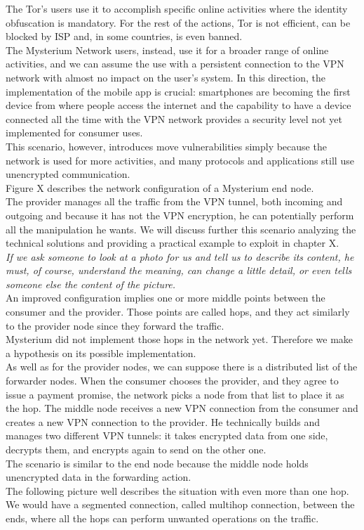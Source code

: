 \documentclass[12pt]{article}
\begin{document}
	The Tor's users use it to accomplish specific online activities where the identity obfuscation is mandatory. For the rest of the actions, Tor is not efficient, can be blocked by ISP and, in some countries, is even banned.\\
	The Mysterium Network users, instead, use it for a broader range of online activities, and we can assume the use with a persistent connection to the VPN network with almost no impact on the user's system. In this direction, the implementation of the mobile app is crucial: smartphones are becoming the first device from where people access the internet and the capability to have a device connected all the time with the VPN network provides a security level not yet implemented for consumer uses.\\
	This scenario, however, introduces move vulnerabilities simply because the network is used for more activities, and many protocols and applications still use unencrypted communication.\\
	
	
	Figure X describes the network configuration of a Mysterium end node.\\
	The provider manages all the traffic from the VPN tunnel, both incoming and outgoing and because it has not the VPN encryption, he can potentially perform all the manipulation he wants. We will discuss further this scenario analyzing the technical solutions and providing a practical example to exploit in chapter X.\\
	\textit{If we ask someone to look at a photo for us and tell us to describe its content, he must, of course, understand the meaning, can change a little detail, or even tells someone else the content of the picture.}\\
	An improved configuration implies one or more middle points between the consumer and the provider. Those points are called hops, and they act similarly to the provider node since they forward the traffic.\\
	Mysterium did not implement those hops in the network yet. Therefore we make a hypothesis on its possible implementation.\\
	As well as for the provider nodes, we can suppose there is a distributed list of the forwarder nodes. When the consumer chooses the provider, and they agree to issue a payment promise, the network picks a node from that list to place it as the hop. The middle node receives a new VPN connection from the consumer and creates a new VPN connection to the provider. He technically builds and manages two different VPN tunnels: it takes encrypted data from one side, decrypts them, and encrypts again to send on the other one.\\
	The scenario is similar to the end node because the middle node holds unencrypted data in the forwarding action.\\
	The following picture well describes the situation with even more than one hop. We would have a segmented connection, called multihop connection, between the ends, where all the hops can perform unwanted operations on the traffic.\\
\end{document}
